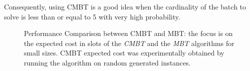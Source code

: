 \documentclass[11pt,a4paper,twoside,openright]{book}
\begin{document}
Consequently, using CMBT is a good idea when the cardinality of the batch to solve is less than or equal to 5 with very high probability.
\begin{figure}[H]
  \begin{center}		         
  \end{center}
\caption[\emph{CMBT} vs \emph{MBT}] {Performance Comparison between CMBT and MBT: the focus is on the expected cost in slots of the \emph{CMBT}  and the \emph{MBT}  algorithms for small sizes. CMBT expected cost was experimentally obtained by running the algorithm on  random generated instances.} 
\label{fig:cmbt-vs-mbt}   
\end{figure}
\end{document}
